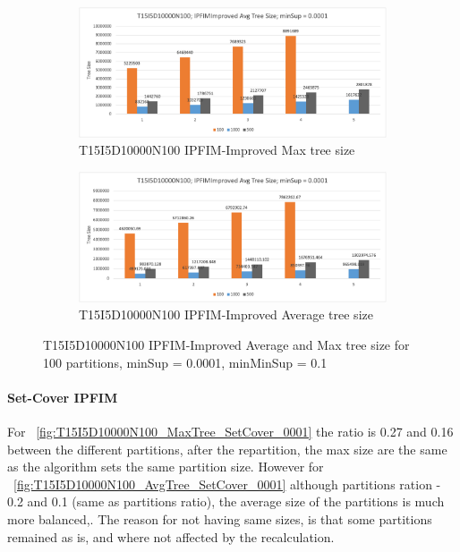 \begin{figure}
  \centering
  \begin{subfigure}{\linewidth}
  \centering
  \includegraphics[width=\linewidth ,height=\textheight, keepaspectratio]{figures/4iterations/T15I5D10000N100_MaxTree_IPFIMImproved_0001}
  \caption{T15I5D10000N100 IPFIM-Improved Max tree size}
  \label{fig:T15I5D10000N100_MaxTree_IPFIMImproved_0001}
\end{subfigure}
  \begin{subfigure}{\linewidth}
  \centering
  \includegraphics[width=\linewidth ,height=\textheight, keepaspectratio]{figures/4iterations/T15I5D10000N100_AvgTree_IPFIMImproved_0001}
  \caption{T15I5D10000N100 IPFIM-Improved Average tree size}
  \label{fig:T15I5D10000N100_AvgTree_IPFIMImproved_0001}
\end{subfigure}
\caption{T15I5D10000N100 IPFIM-Improved Average and Max tree size for 100 partitions,  minSup = 0.0001, minMinSup = 0.1}
\end{figure}

\paragraph{Set-Cover IPFIM}
For ~\autoref{fig:T15I5D10000N100_MaxTree_SetCover_0001} the ratio is 0.27 and 0.16 between the different partitions, after the repartition, the max size are the same as the algorithm sets the same partition size. However for ~\autoref{fig:T15I5D10000N100_AvgTree_SetCover_0001} although partitions ration - 0.2 and 0.1 (same as partitions ratio), the average size of the partitions is much more balanced,. The reason for not having same sizes, is that some partitions remained as is, and where not affected by the recalculation. 

